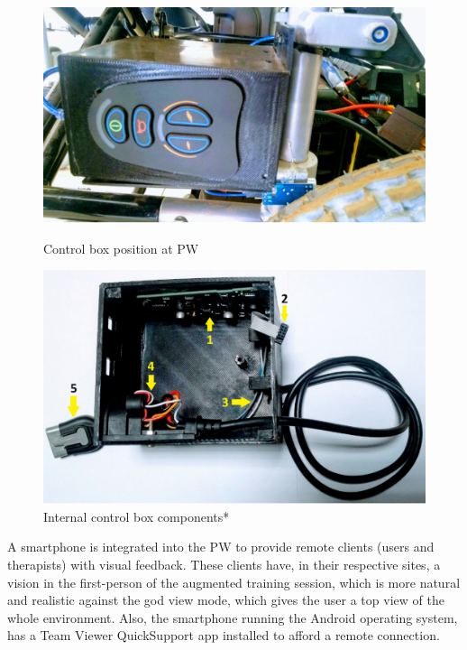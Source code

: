 \begin{figure}[!htbp]
\center
\begin{minipage}{0.495\linewidth}
\center
\captionsetup{justification=centering,margin=0cm,font=small}
\includegraphics[width=0.9\linewidth]{img/cap4/controllerBox-external}
\caption{Control box position at PW} \label{fig:controllerBox-external}
\end{minipage}
\begin{minipage}{0.495\linewidth}
\center
\captionsetup{justification=centering,margin=0cm,font=small}
\includegraphics[width=0.85\linewidth]{img/cap4/controllerBox-internal}
\caption{ Internal control box components*} \label{fig:controllerBox-internal}
\end{minipage}
\end{figure}

A smartphone is integrated into the PW to provide remote clients (users and therapists) with visual feedback. These clients have, in their respective sites, a vision in the first-person of the augmented training session, which is more natural and realistic against the god view mode, which gives the user a top view of the whole environment. Also, the smartphone running the  Android operating system, has a Team Viewer QuickSupport app installed to afford a remote connection.

